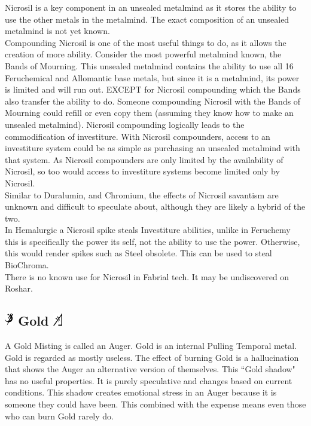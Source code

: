 \documentclass[conference]{IEEEtran}
\begin{document}
Nicrosil is a key component in an unsealed metalmind as it stores the ability to use the other metals in the metalmind.\cite{BoM-CH21}  The exact composition of an unsealed metalmind is not yet known.\\

Compounding Nicrosil is one of the most useful things to do, as it allows the creation of more ability.  Consider the most powerful metalmind known, the Bands of Mourning.  This unsealed metalmind contains the ability to use all 16 Feruchemical and Allomantic base metals,\cite{BoM-CH28} but since it is a metalmind, its power is limited and will run out.\cite{TFE-CH22}  EXCEPT for Nicrosil compounding which the Bands also transfer the ability to do.  Someone compounding Nicrosil with the Bands of Mourning could refill or even copy them (assuming they know how to make an unsealed metalmind).  Nicrosil compounding logically leads to the commodification of investiture.  With Nicrosil compounders, access to an investiture system could be as simple as purchasing an unsealed metalmind with that system.  As Nicrosil compounders are only limited by the availability of Nicrosil, so too would access to investiture systems become limited only by Nicrosil. \\

Similar to Duralumin, and Chromium, the effects of Nicrosil savantism are unknown and difficult to speculate about, although they are likely a hybrid of the two.\\

In Hemalurgic a Nicrosil spike steals Investiture abilities,\cite{HE-TB} unlike in Feruchemy this is specifically the power its self, not the ability to use the power.\cite{PvAvI}  Otherwise, this would render spikes such as Steel obsolete.  This can be used to steal BioChroma.\cite{PvAvI}\\

There is no known use for Nicrosil in Fabrial tech.  It may be undiscovered on Roshar.
\subsection*{\includegraphics[height=1em]{images/Gold.png}  Gold \includegraphics[height=1em]{images/Gold_(Feruchemy).png}}
A Gold Misting is called an Auger.\cite{ARS}  Gold is an internal Pulling Temporal metal.\cite{AL-TB}  Gold is regarded as mostly useless.  The effect of burning Gold is a hallucination that shows the Auger an alternative version of themselves.\cite{ARS}  This ``Gold shadow" has no useful properties.  It is purely speculative and changes based on current conditions.\cite{gd-situation}  This shadow creates emotional stress in an Auger because it is someone they could have been.\cite{TFE-CH37}  This combined with the expense means even those who can burn Gold rarely do.\cite{TFE-CH37}\\
\end{document}

